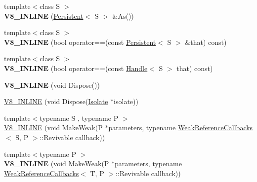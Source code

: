 \begin{DoxyCompactItemize}
\item 
\hypertarget{classv8_1_1_persistent_ac86a42210a627bd42233b488ba03424d}{}{\footnotesize template$<$class S $>$ }\\{\bfseries V8\+\_\+\+I\+N\+L\+I\+N\+E} (\hyperlink{classv8_1_1_persistent}{Persistent}$<$ S $>$ \&As())\label{classv8_1_1_persistent_ac86a42210a627bd42233b488ba03424d}

\item 
\hypertarget{classv8_1_1_persistent_a32cced15af819cd1361625707a6ad2da}{}{\footnotesize template$<$class S $>$ }\\{\bfseries V8\+\_\+\+I\+N\+L\+I\+N\+E} (bool operator==(const \hyperlink{classv8_1_1_persistent}{Persistent}$<$ S $>$ \&that) const)\label{classv8_1_1_persistent_a32cced15af819cd1361625707a6ad2da}

\item 
\hypertarget{classv8_1_1_persistent_a785e524bb25894ace9af1a5eaf050586}{}{\footnotesize template$<$class S $>$ }\\{\bfseries V8\+\_\+\+I\+N\+L\+I\+N\+E} (bool operator==(const \hyperlink{classv8_1_1_handle}{Handle}$<$ S $>$ that) const)\label{classv8_1_1_persistent_a785e524bb25894ace9af1a5eaf050586}

\item 
\hypertarget{classv8_1_1_persistent_adae44eb24d3c568f9ab948d3efd3dbfa}{}{\bfseries V8\+\_\+\+I\+N\+L\+I\+N\+E} (void Dispose())\label{classv8_1_1_persistent_adae44eb24d3c568f9ab948d3efd3dbfa}

\item 
\hyperlink{classv8_1_1_persistent_aa0f3928a4dd02a35d174299346673846}{V8\+\_\+\+I\+N\+L\+I\+N\+E} (void Dispose(\hyperlink{classv8_1_1_isolate}{Isolate} $\ast$isolate))
\item 
{\footnotesize template$<$typename S , typename P $>$ }\\\hyperlink{classv8_1_1_persistent_ae24e248862bb3b5cfa1c16811636ee56}{V8\+\_\+\+I\+N\+L\+I\+N\+E} (void Make\+Weak(P $\ast$parameters, typename \hyperlink{classv8_1_1_weak_reference_callbacks}{Weak\+Reference\+Callbacks}$<$ S, P $>$\+::Revivable callback))
\item 
\hypertarget{classv8_1_1_persistent_af797ee43c3ca38e71d0854b2f96b4b3b}{}{\footnotesize template$<$typename P $>$ }\\{\bfseries V8\+\_\+\+I\+N\+L\+I\+N\+E} (void Make\+Weak(P $\ast$parameters, typename \hyperlink{classv8_1_1_weak_reference_callbacks}{Weak\+Reference\+Callbacks}$<$ T, P $>$\+::Revivable callback))\label{classv8_1_1_persistent_af797ee43c3ca38e71d0854b2f96b4b3b}


\end{DoxyCompactItemize}
